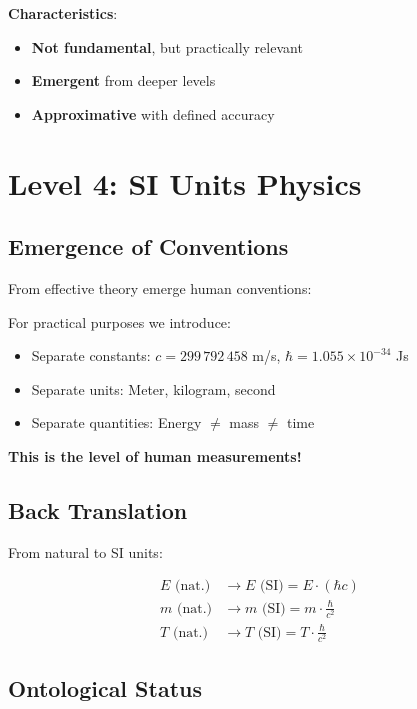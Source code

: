 	\textbf{Characteristics}:
	\begin{itemize}
		\item \textbf{Not fundamental}, but practically relevant
		\item \textbf{Emergent} from deeper levels
		\item \textbf{Approximative} with defined accuracy
	\end{itemize}
	
	\section{Level 4: SI Units Physics}
	
	\subsection{Emergence of Conventions}
	
	From effective theory emerge human conventions:
	
	\begin{keyresult}
		For practical purposes we introduce:
		
		\begin{itemize}
			\item Separate constants: $c = 299\,792\,458$ m/s, $\hbar = 1.055 \times 10^{-34}$ Js
			\item Separate units: Meter, kilogram, second
			\item Separate quantities: Energy $\neq$ mass $\neq$ time
		\end{itemize}
		
		\textbf{This is the level of human measurements!}
	\end{keyresult}
	
	\subsection{Back Translation}
	
	From natural to SI units:
	
	\begin{align}
		E \text{ (nat.)} &\to E \text{ (SI)} = E \cdot (\hbar c) \\
		m \text{ (nat.)} &\to m \text{ (SI)} = m \cdot \frac{\hbar}{c^2} \\
		T \text{ (nat.)} &\to T \text{ (SI)} = T \cdot \frac{\hbar}{c^2}
	\end{align}
	
	\subsection{Ontological Status}
	
